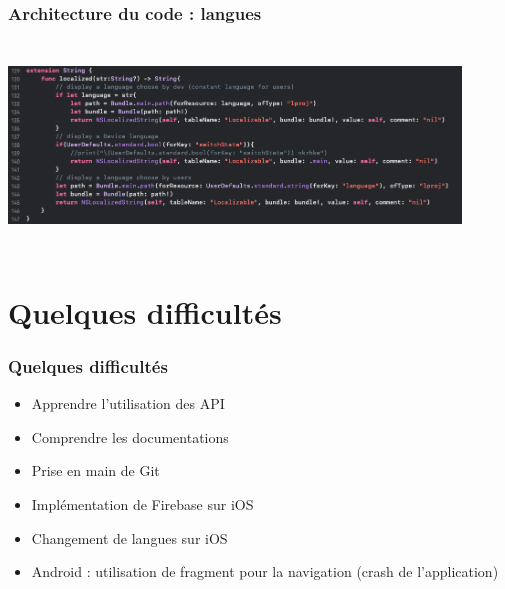 \documentclass{beamer}
\begin{document}
  \begin{frame}
    \frametitle{Architecture du code : langues}

    \begin{center}
      \includegraphics[height=55mm, width=120mm, scale=0.5]{language(iOS).png}
    \end{center}

  \end{frame}


%
%
\section{Quelques difficultés}
%
%
\begin{frame}
  \frametitle{Quelques difficultés}
  \begin{itemize}
    \item Apprendre l'utilisation des API
    \item Comprendre les documentations
    \item Prise en main de Git
    \item Implémentation de Firebase sur iOS
    \item Changement de langues sur iOS
    \item Android : utilisation de fragment pour la navigation (crash de l'application)
  \end{itemize}
\end{frame}
\end{document}
